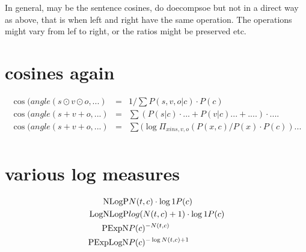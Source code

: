 In general, may be the sentence cosines, do doecompsoe but not in a direct way as above, that is when left and right have the same operation. The operations might vary from lef to right, or the ratios might be preserved etc. 



\section{cosines again}

\begin{eqnarray}
\cos(angle(s\odot v\odot o, ...) &=&  1/ \sum P(s,v,o|c) \cdot P(c)\\
\cos(angle(s+v+o, ...) &=& \sum (P(s|c)  \cdot  ... + P(v|c) ... + ....)  \cdot  ....\\
\cos(angle(s+v+o, ...) &=&  \sum (\log{\Pi_{x in s,v,o} (P(x,c)/P(x) \cdot P(c)) ...}\\
\end{eqnarray}

\section{various log measures}

\begin{eqnarray}
\textmd{NLogP}&   N(t,c)  \cdot \log{1}{P(c)}\\
\textmd{LogNLogP}&  log(N(t,c)+1) \cdot \log{1}{P(c)}\\
\textmd{PExpN}&    P(c)^{-N(t,c)}\\
\textmd{PExpLogN}& P(c)^{-\log{N(t,c)+1}}\\
\end{eqnarray}

